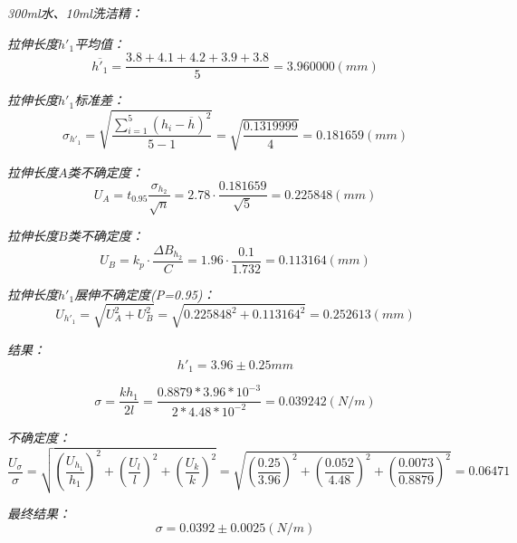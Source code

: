 \documentclass[UTF8]{ctexart}
\begin{document}
    \begin{center}
        \emph{300ml水、10ml洗洁精：}
    \end{center}
 
    \emph{拉伸长度$h'_1$平均值：}
    \begin{equation*}
        \overline{h'_1}=\frac{3.8+	4.1	+4.2+	3.9	+3.8}{5} =3.960000(mm)
    \end{equation*}

    \emph{拉伸长度$h'_1$标准差：}
    \begin{equation*}
        \sigma _{h'_1}=\sqrt{\frac{\sum_{i=1}^5 (h_i-\overline{h})^2}{5-1}}= \sqrt{\frac{0.1319999}{4}}=0.181659(mm)
    \end{equation*}

    \emph{拉伸长度$A$类不确定度：}
    \begin{equation*}
        U_A=t_{0.95}\frac{\sigma_{h_2}}{\sqrt{n}}=2.78·\frac{0.181659}{\sqrt{5}}=0.225848(mm)
    \end{equation*}

    \emph{拉伸长度$B$类不确定度：}
    \begin{equation*}
        U_B=k_p·\frac{\varDelta B_{h_2}}{C}=1.96·\frac{0.1}{1.732}=0.113164(mm)
    \end{equation*}

    \emph{拉伸长度$h'_1$展伸不确定度(P=0.95)：}
    \begin{equation*}
       U_{h'_1}=\sqrt{U_A^2+U_B^2}=\sqrt{0.225848^2+0.113164^2}=0.252613(mm)
    \end{equation*}

    \emph{结果：}
    \begin{equation*}
        h'_1=3.96±0.25mm 
    \end{equation*}

    \begin{equation*}
        \sigma = \frac{kh_1}{2l} = \frac{0.8879*3.96*10^{-3}}{2*4.48*10^{-2}} = 0.039242(N/m)
    \end{equation*}
    
    \emph{不确定度：}
    \begin{equation*}
        \frac{U_{\sigma}}{\sigma}=\sqrt{(\frac{U_{h_1}}{h_1})^2+(\frac{U_l}{l})^2+(\frac{U_k}{k})^2}=
        \sqrt{(\frac{0.25}{3.96})^2+(\frac{0.052}{4.48})^2+(\frac{0.0073}{0.8879})^2}= 0.06471
    \end{equation*}

    \emph{最终结果：}
    \begin{equation}
        \sigma=0.0392±0.0025(N/m)
    \end{equation}
\end{document}
